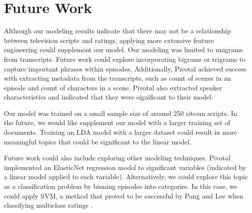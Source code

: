 \documentclass{sig-alternate-05-2015}
\begin{document}
\section{Future Work}

Although our modeling results indicate that there may not be a relationship between television scripts and ratings, applying more extensive feature engineering could supplement our model. Our modeling was limited to unigrams from transcripts. Future work could explore incorporating bigrams or trigrams to capture important phrases within episodes. Additionally, Pivotal achieved success with extracting metadata from the transcripts, such as count of scenes in an episode and count of characters in a scene. Pivotal also extracted speaker characteristics and indicated that they were significant to their model.

Our model was trained on a small sample size of around 250 sitcom scripts. In the future, we would like supplement our model with a larger training set of documents. Training an LDA model with a larger dataset could result in more meaningful topics that could be significant to the linear model.

Future work could also include exploring other modeling techniques. Pivotal implemented an ElasticNet regression model to significant variables (indicated by a linear model applied to each variable). Alternatively, we could explore this topic as a classification problem by binning episodes into categories. In this case, we could apply SVM, a method that proved to be successful by Pang and Lee when classifying multiclass ratings \cite{Pang:2005:SSE:1219840.1219855}.\hfill \break
\hfill \break



\balancecolumns %
\end{document}
